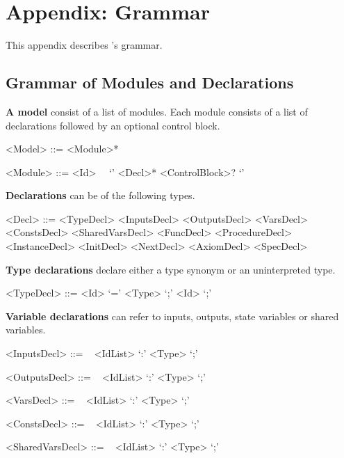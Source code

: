 \chapter{Appendix: \uclid{} Grammar}

\newcommand{\paratitle}[1]{\textsf{\textbf{#1}}}
\newcommand{\nonterminal}[1]{$\langle \textit{#1} \rangle$}

This appendix describes \uclid{}'s grammar.

\section{Grammar of Modules and Declarations}
\paratitle{A model} consist of a list of modules. Each module consists of a list of declarations followed by an optional control block.
\begin{grammar}
     <Model> ::= <Module>*

     <Module> ::=  <Id>~~ `{' <Decl>* <ControlBlock>? `}'
\end{grammar}

\paratitle{Declarations} can be of the following types.
\begin{grammar}
     <Decl> ::= <TypeDecl> 
            \alt <InputsDecl> 
            \alt <OutputsDecl> 
            \alt <VarsDecl> 
            \alt <ConstsDecl> 
            \alt <SharedVarsDecl> 
            \alt <FuncDecl> 
            \alt <ProcedureDecl> 
            \alt <InstanceDecl>
            \alt <InitDecl> 
            \alt <NextDecl> 
            \alt <AxiomDecl>
            \alt <SpecDecl> 
\end{grammar}

\paratitle{Type declarations} declare either a type synonym or an uninterpreted type.
\begin{grammar}
     <TypeDecl> ::=  <Id> `=' <Type> `;'
              \alt {} <Id> `;'

\end{grammar}

\paratitle{Variable declarations} can refer to inputs, outputs, state variables or shared variables.
\begin{grammar}
     <InputsDecl> ::=
        ~ <IdList> `:' <Type> `;'

     <OutputsDecl> ::=
        ~ <IdList> `:' <Type> `;'

     <VarsDecl> ::=
        ~ <IdList> `:' <Type> `;'

     <ConstsDecl> ::=
        ~ <IdList> `:' <Type> `;'

     <SharedVarsDecl> ::=
        ~ <IdList> `:' <Type> `;'

\end{grammar}

